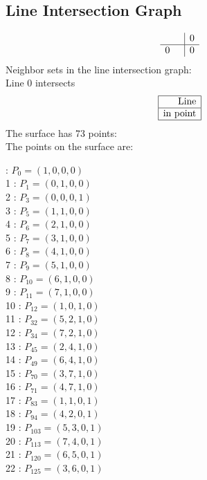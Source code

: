 \documentclass{article}
\begin{document}
{\subsection*{Line Intersection Graph}
{\arraycolsep=1pt
$$
\begin{array}{rr|*{1}r}
 &  & 0\\
\hline
0 &  & 0\\
\end{array}
$$
}%
Neighbor sets in the line intersection graph:\\
Line 0 intersects 
$$
\begin{array}{|r*{0}{|c}|}
\hline
\mbox{Line} \\
\hline
\mbox{in point} \\
\hline
\end{array}
$$
The surface has 73 points:\\
The points on the surface are:\\
\begin{multicols}{3}
 : $P_{0}=( 1, 0, 0, 0 )$\\
1 : $P_{1}=( 0, 1, 0, 0 )$\\
2 : $P_{3}=( 0, 0, 0, 1 )$\\
3 : $P_{5}=( 1, 1, 0, 0 )$\\
4 : $P_{6}=( 2, 1, 0, 0 )$\\
5 : $P_{7}=( 3, 1, 0, 0 )$\\
6 : $P_{8}=( 4, 1, 0, 0 )$\\
7 : $P_{9}=( 5, 1, 0, 0 )$\\
8 : $P_{10}=( 6, 1, 0, 0 )$\\
9 : $P_{11}=( 7, 1, 0, 0 )$\\
10 : $P_{12}=( 1, 0, 1, 0 )$\\
11 : $P_{32}=( 5, 2, 1, 0 )$\\
12 : $P_{34}=( 7, 2, 1, 0 )$\\
13 : $P_{45}=( 2, 4, 1, 0 )$\\
14 : $P_{49}=( 6, 4, 1, 0 )$\\
15 : $P_{70}=( 3, 7, 1, 0 )$\\
16 : $P_{71}=( 4, 7, 1, 0 )$\\
17 : $P_{83}=( 1, 1, 0, 1 )$\\
18 : $P_{94}=( 4, 2, 0, 1 )$\\
19 : $P_{103}=( 5, 3, 0, 1 )$\\
20 : $P_{113}=( 7, 4, 0, 1 )$\\
21 : $P_{120}=( 6, 5, 0, 1 )$\\
22 : $P_{125}=( 3, 6, 0, 1 )$\\

\end{multicols}}
\end{document}
